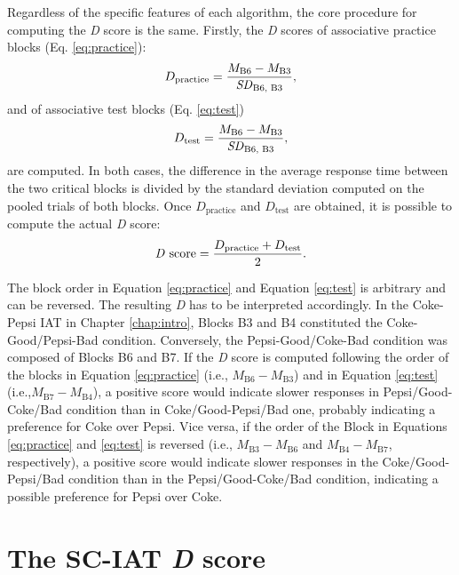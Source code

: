 \documentclass[12pt]{book}
\begin{document}
Regardless of the specific features of each algorithm, the core procedure for computing the \emph{D} score is the same. Firstly, the \emph{D} scores of associative practice blocks (Eq. \ref{eq:practice}):
%
\begin{equation}\label{eq:practice}
D_{\text{practice}} = \frac{M_{\text{B6}} - M_{\text{B3}}}{\text{\emph{SD}}_{\text{B6, B3}}}, 
\end{equation}
%
and of associative test blocks (Eq. \ref{eq:test}) 
%
\begin{equation}\label{eq:test}
D_{\text{test}} = \frac{M_{\text{B6}} - M_{\text{B3}}}{\text{\emph{SD}}_{\text{B6, B3}}},
\end{equation}
are computed.
In both cases, the difference in the average response time between the two critical blocks is divided by the standard deviation computed on the pooled trials of both blocks. Once $D_{\text{practice}}$ and $D_{\text{test}}$ are obtained, it is possible to compute the actual \emph{D} score: 
%
\begin{equation}\label{eq:dscore}
\text{\emph{D} score} = \frac{D_{\text{practice}} + D_{\text{test}}}{2}.
\end{equation}

The block order in Equation \ref{eq:practice} and Equation \ref{eq:test} is arbitrary and can be reversed. The resulting \emph{D} has to be interpreted accordingly. 
In the Coke-Pepsi IAT in Chapter \ref{chap:intro}, Blocks B3 and B4 constituted the Coke-Good/Pepsi-Bad condition. 
Conversely, the Pepsi-Good/Coke-Bad condition was composed of Blocks B6 and B7.
If the \emph{D} score is computed following the order of the blocks in Equation \ref{eq:practice} (i.e., $M_{\text{B6}} - M_{\text{B3}}$) and in Equation \ref{eq:test} (i.e.,$M_{\text{B7}} - M_{\text{B4}}$), a positive score would indicate slower responses in Pepsi/Good-Coke/Bad condition than in Coke/Good-Pepsi/Bad one, probably indicating a preference for Coke over Pepsi. Vice versa, if the order of the Block in Equations \ref{eq:practice} and \ref{eq:test} is reversed (i.e., $M_{\text{B3}} - M_{\text{B6}}$ and $M_{\text{B4}} - M_{\text{B7}}$, respectively), a positive score would indicate slower responses in the Coke/Good-Pepsi/Bad condition than in the Pepsi/Good-Coke/Bad condition, indicating a possible preference for Pepsi over Coke.


\section{The SC-IAT \emph{D} score}\label{sec:sciatD}
\end{document}
